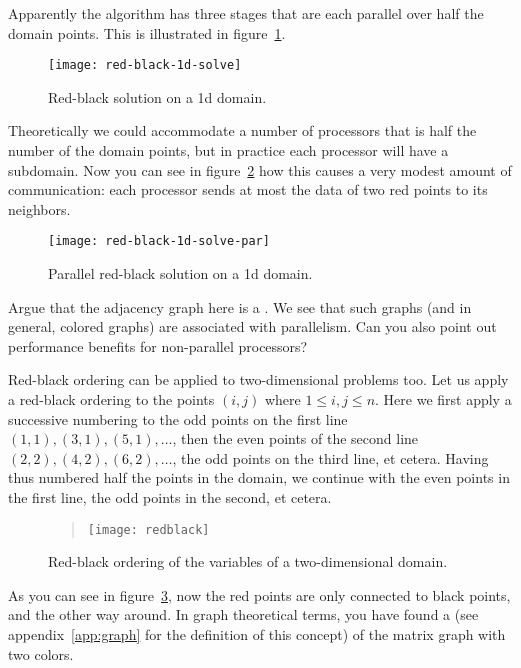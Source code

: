 Apparently the algorithm has three stages that are each parallel over
half the domain points. This is illustrated in
figure~\ref{fig:1d-rb-solve}.
\begin{figure}[ht]
  \texttt{[image: red-black-1d-solve]}
  \caption{Red-black solution on a 1d domain.}
  \label{fig:1d-rb-solve}
\end{figure}
Theoretically we could accommodate a number of processors that is half
the number of the domain points, but in practice each processor will
have a subdomain. Now you can see in figure~\ref{fig:1d-rb-solve-par}
how this causes a very modest amount of communication: each processor
sends at most the data of two red points to its neighbors.
\begin{figure}[ht]
  \texttt{[image: red-black-1d-solve-par]}
  \caption{Parallel red-black solution on a 1d domain.}
  \label{fig:1d-rb-solve-par}
\end{figure}

\begin{exercise}
  Argue that the adjacency graph here is a .
  We see that such graphs (and in general, colored graphs) are associated with parallelism.
  Can you also point out performance benefits for non-parallel processors?
\end{exercise}

Red-black ordering can be applied to two-dimensional problems too.
Let us apply a red-black ordering to the points $(i,j)$ where $1\leq
i,j\leq n$.
Here we first apply a successive numbering to the odd
points on the first line $(1,1),(3,1),(5,1),\ldots$, then the even
points of the second line $(2,2),(4,2),(6,2),\ldots$, the odd points
on the third line, et cetera. Having thus numbered half the points in
the domain, we continue with the even points in the first line, the
odd points in the second, et cetera.
\begin{figure}[ht]
  \begin{quote}
    \texttt{[image: redblack]}
  \end{quote}
  \caption{Red-black ordering of the variables of a two-dimensional
    domain.}
  \label{fig:redblack}
\end{figure}
As you can see in figure~\ref{fig:redblack}, now the red points are
only connected to black points, and the other way around. In graph
theoretical terms, you have found a  
(see appendix~\ref{app:graph} for the definition
of this concept) of the matrix graph with two colors.


